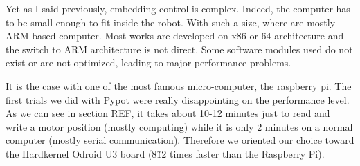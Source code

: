 Yet as I said previously, embedding control is complex. Indeed, the computer has to be small enough to fit inside the robot. With such a size, where are mostly ARM based computer. Most works are developed on x86 or 64 architecture and the switch to ARM architecture is not direct. Some software modules used do not exist or are not optimized, leading to major performance problems.

It is the case with one of the most famous micro-computer, the raspberry pi. The first trials we did with Pypot were really disappointing on the performance level. As we can see in section REF, it takes about 10-12 minutes just to read and write a motor position (mostly computing) while it is only 2 minutes on a normal computer (mostly serial communication). Therefore we oriented our choice toward the Hardkernel Odroid U3 board (8\~12 times faster than the Raspberry Pi).

